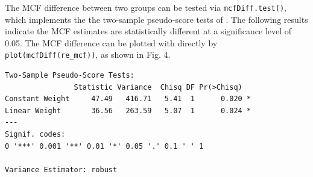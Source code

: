 The MCF difference between two groups can be tested via
\texttt{mcfDiff.test()}, which implements the the two-sample
pseudo-score tests of \citep{cook1996biometrics}. The following results
indicate the MCF estimates are statistically different at a significance
level of 0.05. The MCF difference can be plotted with directly by
\texttt{plot(mcfDiff(re\_mcf))}, as shown in Fig. 4.

\begin{Shaded}
\begin{Highlighting}[]
\end{Highlighting}
\end{Shaded}

\begin{verbatim}
Two-Sample Pseudo-Score Tests:
                Statistic Variance  Chisq DF Pr(>Chisq)  
Constant Weight     47.49   416.71   5.41  1      0.020 *
Linear Weight       36.56   263.59   5.07  1      0.024 *
---
Signif. codes:  
0 '***' 0.001 '**' 0.01 '*' 0.05 '.' 0.1 ' ' 1

Variance Estimator: robust 
\end{verbatim}
